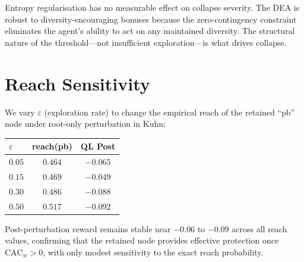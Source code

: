 \documentclass{article}
\begin{document}
Entropy regularisation has no measurable effect on collapse severity. The DEA is robust to diversity-encouraging bonuses because the zero-contingency constraint eliminates the agent's ability to act on any maintained diversity. The structural nature of the threshold---not insufficient exploration---is what drives collapse.

\section{Reach Sensitivity}
\label{app:reach}

We vary $\varepsilon$ (exploration rate) to change the empirical reach of the retained ``pb'' node under root-only perturbation in Kuhn:

\begin{center}
\begin{tabular}{lcc}
\toprule
$\varepsilon$ & reach(pb) & QL Post \\
\midrule
$0.05$ & $0.464$ & $-0.065$ \\
$0.15$ & $0.469$ & $-0.049$ \\
$0.30$ & $0.486$ & $-0.088$ \\
$0.50$ & $0.517$ & $-0.092$ \\
\bottomrule
\end{tabular}
\end{center}

Post-perturbation reward remains stable near $-0.06$ to $-0.09$ across all reach values, confirming that the retained node provides effective protection once $\text{CAC}_w > 0$, with only modest sensitivity to the exact reach probability.
\end{document}

